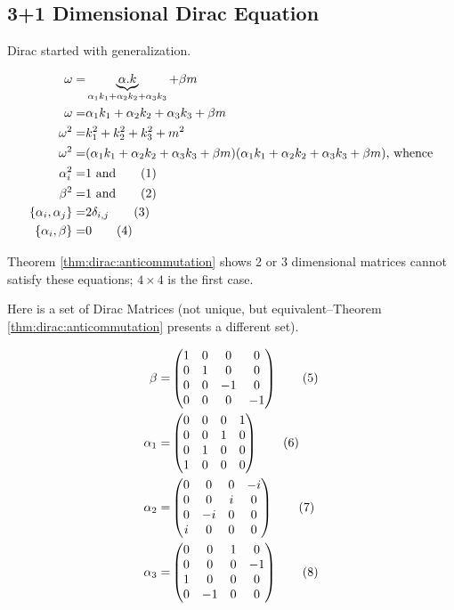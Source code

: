 \documentclass[]{article}
\newcommand\numberthis{\addtocounter{equation}{1}\tag{\theequation}}
\begin{document}
\subsection{3+1 Dimensional Dirac Equation}

Dirac started with generalization.

\begin{align*}
\omega =& \underbrace{\alpha . k}_{\alpha_1 k_1 + \alpha_2 k_2 + \alpha_3 k_3} +\beta m\\
\omega =& \alpha_1 k_1 + \alpha_2 k_2 + \alpha_3 k_3 +\beta m\\
\omega^2 =& k_1^2 + k_2^2 +k_3^2 +m^2\\
\omega^2 =& (\alpha_1 k_1 + \alpha_2 k_2 + \alpha_3 k_3 +\beta m)(\alpha_1 k_1 + \alpha_2 k_2 + \alpha_3 k_3 +\beta m) \text{, whence}\\
\alpha_i^2 =& 1  \text{ and} \numberthis \label{eq:dirac:ac1}\\
\beta^2 =& 1 \text{ and} \numberthis \label{eq:dirac:ac2}\\
\{\alpha_i,\alpha_j\} =& 2 \delta_{i,j} \numberthis \label{eq:dirac:ac3}\\
\{\alpha_i,\beta\} =& 0 \numberthis \label{eq:dirac:ac4}
\end{align*}

Theorem \ref{thm:dirac:anticommutation} shows 2 or 3 dimensional matrices cannot satisfy these equations; $4 \times 4$ is the first case.

Here is a set of Dirac Matrices (not unique, but equivalent--Theorem \ref{thm:dirac:anticommutation} presents a different set).

\begin{align*}
	\beta =& \begin{pmatrix}
		1&0&0&0\\
		0&1&0&0\\
		0&0&-1&0\\
		0&0&0&-1
	\end{pmatrix} \numberthis \label{eq:beta:1}\\
	\alpha_1 =& \begin{pmatrix}
		0&0&0&1\\
		0&0&1&0\\
		0&1&0&0\\
		1&0&0&0
	\end{pmatrix}\numberthis \label{eq:alpha1:1}\\ 
	\alpha_2 =& \begin{pmatrix}
		0&0&0&-i\\
		0&0&i&0\\
		0&-i&0&0\\
		i&0&0&0
	\end{pmatrix} \numberthis \label{eq:alpha2:1} \\ 
	\alpha_3 =& \begin{pmatrix}
		0&0&1&0\\
		0&0&0&-1\\
		1&0&0&0\\
		0&-1&0&0 
	\end{pmatrix} \numberthis \label{eq:alpha3:1}
\end{align*}
\end{document}
